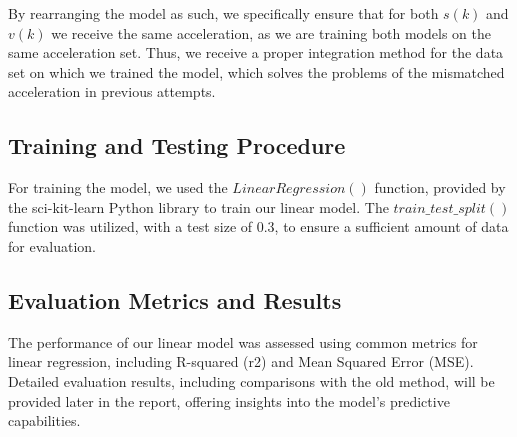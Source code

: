 By rearranging the model as such, we specifically ensure that for both $s(k)$ and $v(k)$ we receive the same 
acceleration, as we are training both models on the same acceleration set.
Thus, we receive a proper integration method for the data set on which we trained the model, which solves the 
problems of the mismatched acceleration in previous attempts.

\subsection{Training and Testing Procedure} 
For training the model, we used the $LinearRegression()$ function, provided by the sci-kit-learn Python library to train our linear model.
The $train\_test\_split()$ function was utilized, with a test size of 0.3, to ensure a sufficient amount of data 
for evaluation.

\subsection{Evaluation Metrics and Results} 
The performance of our linear model was assessed using common metrics for linear regression, including 
R-squared (r2) and Mean Squared Error (MSE). 
Detailed evaluation results, including comparisons with the old method, will be provided later in the report, 
offering insights into the model's predictive capabilities.

